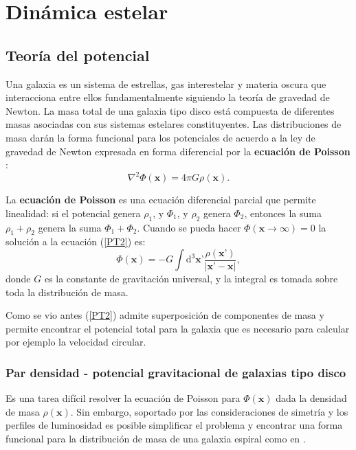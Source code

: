 \chapter{Dinámica estelar}

\section{Teoría del potencial}

Una galaxia es un sistema de estrellas, gas interestelar y materia oscura que interacciona entre ellos fundamentalmente siguiendo la teoría de gravedad de Newton. La masa total de una galaxia tipo disco está compuesta de diferentes masas asociadas con sus sistemas estelares constituyentes. Las distribuciones de masa darán la forma funcional para los potenciales de acuerdo a la ley de gravedad de Newton expresada en forma diferencial por la \textbf{ecuación de Poisson} \cite{Samurovic07, BT08}:
\begin{equation}
\label{PT2}
\nabla^2 \Phi (\textbf{x}) = 4\pi  G \rho (\textbf{x}).
\end{equation}

La \textbf{ecuación de Poisson} es una ecuación diferencial parcial que permite linealidad: si el potencial genera $\rho_1$, y $\Phi_1$, y $\rho_2$ genera $\Phi_2$, entonces la suma $\rho_1 + \rho_2$ genera la suma $\Phi_1+ \Phi_2$. Cuando se pueda hacer $\Phi(\textbf{x}\rightarrow \infty) = 0$ la solución a la ecuación (\ref{PT2}) es:
\begin{equation}
\label{PT1}
\Phi(\textbf{x}) = -G \int \textrm{d}^3   \textbf{x'} \frac{\rho(\textbf{x'})}{| \textbf{x'}-\textbf{x} |},
\end{equation}
donde $G$ es la constante de gravitación universal, y la integral es tomada sobre toda la distribución de masa.

Como se vio antes (\ref{PT2}) admite superposición de componentes de masa y permite encontrar el potencial total para la galaxia que es necesario para calcular por ejemplo la velocidad circular. 

\subsection{Par densidad - potencial gravitacional de galaxias tipo disco}

Es una tarea difícil resolver la ecuación de Poisson para $\Phi(\textbf{x})$ dada la densidad de masa $\rho (\textbf{x})$. Sin embargo, soportado por las consideraciones de simetría y los perfiles de luminosidad es posible simplificar el problema y encontrar una forma funcional para la distribución de masa de una galaxia espiral como en \cite{Miyamoto75}.

